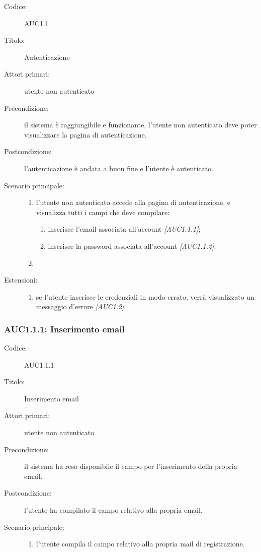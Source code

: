 \documentclass[../../../analisi-dei-requisiti.tex]{subfiles}
\begin{document}
\begin{description}
  \item[Codice:] AUC1.1
  \item[Titolo:] Autenticazione
  \item[Attori primari:] utente non autenticato
  \item[Precondizione:] il sistema è raggiungibile e funzionante, l'utente non autenticato deve poter visualizzare la pagina di autenticazione.
  \item[Postcondizione:] l'autenticazione è andata a buon fine e l'utente è autenticato.
  \item[Scenario principale:]
  \begin{enumerate}
    \item  l'utente non autenticato accede alla pagina di autenticazione, e visualizza tutti i campi che deve compilare:
    \begin{enumerate}
      \item inserisce l’email associata all’account \emph{[AUC1.1.1]};
      \item inserisce la password associata all’account \emph{[AUC1.1.2]}.
    \end{enumerate}
    \item
  \end{enumerate}
  \item[Estensioni:]
  \begin{enumerate}
    \item se l'utente inserisce le credenziali in modo errato, verrà visualizzato un messaggio d'errore \emph{[AUC1.2]}.
  \end{enumerate}
\end{description}

\subsubsection{AUC1.1.1: Inserimento email}%
\label{subs:AUC1.1.1}
\begin{description}
  \item[Codice:] AUC1.1.1
  \item[Titolo:] Inserimento email
  \item[Attori primari:] utente non autenticato
  \item[Precondizione:] il sistema ha reso disponibile il campo per l'inserimento della propria email.
  \item[Postcondizione:] l'utente ha compilato il campo relativo alla propria email.
  \item[Scenario principale:]
  \begin{enumerate}
    \item l'utente compila il campo relativo alla propria mail di registrazione.
  \end{enumerate}
\end{description}
\end{document}
